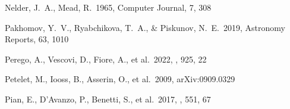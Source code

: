 \documentclass[twocolumn,twocolappendix]{aastex63}
\begin{document}
\begin{thebibliography}{}












 Nelder, J.~A., Mead, R.\ 1965, Computer Journal, 7, 308





 Pakhomov, Y.~V., Ryabchikova, T.~A., \& Piskunov, N.~E.\ 2019, Astronomy Reports, 63, 1010






 Perego, A., Vescovi, D., Fiore, A., et al.\ 2022, \apj, 925, 22


 Petelet, M., Iooss, B., Asserin, O., et al.\ 2009, arXiv:0909.0329


 Pian, E., D'Avanzo, P., Benetti, S., et al.\ 2017, \nat, 551, 67





\end{thebibliography}
\end{document}
